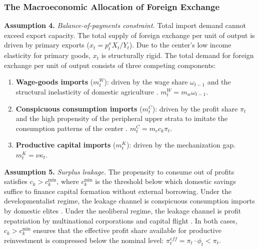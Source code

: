\subsubsection{The Macroeconomic Allocation of Foreign
	Exchange}

\textbf{Assumption 4.} \textit{Balance-of-payments
	constraint.} Total import demand cannot exceed export
capacity. The total supply of foreign exchange per unit of
output is driven by primary exports
($x_t = p_t^x X_t / Y_t$). Due to the center's low income
elasticity for primary goods, $x_t$ is structurally rigid.
The total demand for foreign exchange per unit of output
consists of three competing components:
\begin{enumerate}
	\item \textbf{Wage-goods imports} ($m^W_t$): driven by the
	wage share $\omega_{t-1}$ and the structural inelasticity
	of domestic agriculture \citep{Kaldor1959}.
	$m^W_t = m_w \omega_{t-1}$.
	\item \textbf{Conspicuous consumption imports} ($m^C_t$):
	driven by the profit share $\pi_t$ and the high propensity
	of the peripheral upper strata to imitate the consumption
	patterns of the center \citep{Prebisch1981, Kaldor1959}.
	$m^C_t = m_c c_k \pi_t$.
	\item \textbf{Productive capital imports} ($m^K_t$): driven
	by the mechanization gap. $m^K_t = \nu \kappa_t$.
\end{enumerate}

\textbf{Assumption 5.} \textit{Surplus leakage.} The
propensity to consume out of profits satisfies
$c_k > c_k^{\min}$, where $c_k^{\min}$ is the threshold
below which domestic savings suffice to finance capital
formation without external borrowing. Under the
developmentalist regime, the leakage channel is conspicuous
consumption imports by domestic elites
\citep{Prebisch1981, Kaldor1959}. Under the neoliberal
regime, the leakage channel is profit repatriation by
multinational corporations and capital flight
\citep{Ahumada2019}. In both cases, $c_k > c_k^{\min}$
ensures that the effective profit share available for
productive reinvestment is compressed below the nominal
level: $\pi_t^{eff} = \pi_t \cdot \phi_t < \pi_t$.

